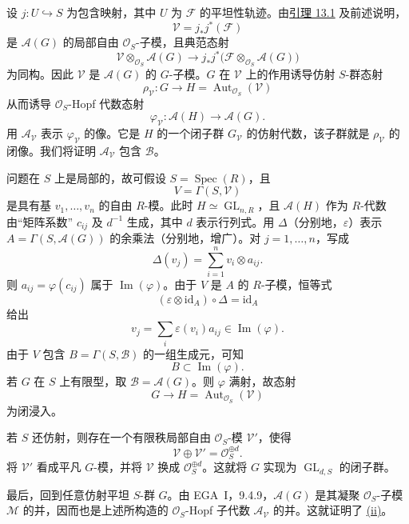 设 \(j:U\hookrightarrow S\) 为包含映射，其中 \(U\) 为 \(\mathcal F\) 的平坦性轨迹。由\hyperref[lem:sga3-VIB-13.1]{引理 13.1} 及前述说明，
\[
  \mathcal V=j_*j^*(\mathcal F)
\]
是 \(\mathcal A(G)\) 的局部自由 \(\mathcal O_S\)-子模，且典范态射
\label{form:sga3-VIB-13.2-V-stability}%
\[
  \mathcal V\otimes_{\mathcal O_S}\mathcal A(G)
    \longrightarrow
  j_*j^*\bigl(\mathcal F\otimes_{\mathcal O_S}\mathcal A(G)\bigr)
\]
为同构。因此 \(\mathcal V\) 是 \(\mathcal A(G)\) 的 \(G\)-子模。\(G\) 在 \(\mathcal V\) 上的作用诱导仿射 \(S\)-群态射
\[
  \rho_{\mathcal V}:
  G\longrightarrow
  H=\operatorname{Aut}_{\mathcal O_S}(\mathcal V)
\]
从而诱导 \(\mathcal O_S\)-Hopf 代数态射
\[
  \varphi_{\mathcal V}:\mathcal A(H)\longrightarrow\mathcal A(G).
\]
用 \(\mathcal A_{\mathcal V}\) 表示 \(\varphi_{\mathcal V}\) 的像。它是 \(H\) 的一个闭子群 \(G_{\mathcal V}\) 的仿射代数，该子群就是 \(\rho_{\mathcal V}\) 的闭像。我们将证明 \(\mathcal A_{\mathcal V}\) 包含 \(\mathcal B\)。

问题在 \(S\) 上是局部的，故可假设 \(S=\operatorname{Spec}(R)\)，且
\[
  V=\Gamma(S,\mathcal V)
\]
是具有基 \(v_1,\ldots,v_n\) 的自由 \(R\)-模。此时 \(H\simeq\operatorname{GL}_{n,R}\)，且 \(\mathcal A(H)\) 作为 \(R\)-代数由“矩阵系数” \(c_{ij}\) 及 \(d^{-1}\) 生成，其中 \(d\) 表示行列式。用 \(\Delta\)\textup{（分别地，\(\varepsilon\)）}表示 \(A=\Gamma(S,\mathcal A(G))\) 的余乘法\textup{（分别地，增广）}。对 \(j=1,\ldots,n\)，写成
\label{form:sga3-VIB-13.2-matrix-coefficients}%
\[
  \Delta(v_j)=\sum_{i=1}^{n}v_i\otimes a_{ij}.
\]
则 \(a_{ij}=\varphi(c_{ij})\) 属于 \(\operatorname{Im}(\varphi)\)。由于 \(V\) 是 \(A\) 的 \(R\)-子模，恒等式
\[
  (\varepsilon\otimes\mathrm{id}_A)\circ\Delta
    =\mathrm{id}_A
\]
给出
\[
  v_j=\sum_i\varepsilon(v_i)a_{ij}
    \in\operatorname{Im}(\varphi).
\]
由于 \(V\) 包含 \(B=\Gamma(S,\mathcal B)\) 的一组生成元，可知
\[
  B\subset\operatorname{Im}(\varphi).
\]
若 \(G\) 在 \(S\) 上有限型，取 \(\mathcal B=\mathcal A(G)\)。则 \(\varphi\) 满射，故态射
\[
  G\longrightarrow
  H=\operatorname{Aut}_{\mathcal O_S}(\mathcal V)
\]
为闭浸入。

若 \(S\) 还仿射，则存在一个有限秩局部自由 \(\mathcal O_S\)-模 \(\mathcal V'\)，使得
\[
  \mathcal V\oplus\mathcal V'
    =\mathcal O_S^{\oplus d}.
\]
将 \(\mathcal V'\) 看成平凡 \(G\)-模，并将 \(\mathcal V\) 换成 \(\mathcal O_S^{\oplus d}\)。这就将 \(G\) 实现为 \(\operatorname{GL}_{d,S}\) 的闭子群。

最后，回到任意仿射平坦 \(S\)-群 \(G\)。由 EGA~I，9.4.9，\(\mathcal A(G)\) 是其凝聚 \(\mathcal O_S\)-子模 \(\mathcal M\) 的并，因而也是上述所构造的 \(\mathcal O_S\)-Hopf 子代数 \(\mathcal A_{\mathcal V}\) 的并。这就证明了 \hyperref[concl:sga3-VIB-13.2-ii]{\textup{(ii)}}。

